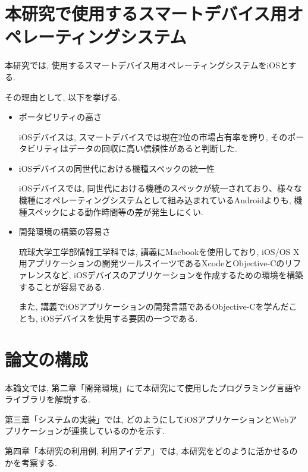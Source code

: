 \section{本研究で使用するスマートデバイス用オペレーティングシステム}
本研究では, 使用するスマートデバイス用オペレーティングシステムをiOSとする.

その理由として, 以下を挙げる.

\begin{itemize}
\item ポータビリティの高さ

iOSデバイスは, スマートデバイスでは現在2位の市場占有率を誇り, そのポータビリティはデータの回収に高い信頼性があると判断した.

\item iOSデバイスの同世代における機種スペックの統一性

iOSデバイスでは, 同世代における機種のスペックが統一されており、様々な機種にオペレーティングシステムとして組み込まれているAndroidよりも, 機種スペックによる動作時間等の差が発生しにくい.

\item 開発環境の構築の容易さ

琉球大学工学部情報工学科では, 講義にMacbookを使用しており, iOS/OS X用アプリケーションの開発ツールスイーツであるXcodeとObjective-Cのリファレンスなど, iOSデバイスのアプリケーションを作成するための環境を構築することが容易である.

また, 講義でiOSアプリケーションの開発言語であるObjective-Cを学んだことも, iOSデバイスを使用する要因の一つである.

\end{itemize}

\section{論文の構成}
本論文では, 第二章「開発環境」にて本研究にて使用したプログラミング言語やライブラリを解説する.

第三章「システムの実装」では, どのようにしてiOSアプリケーションとWebアプリケーションが連携しているのかを示す.

第四章「本研究の利用例, 利用アイデア」では, 本研究をどのように活かせるのかを考察する.

